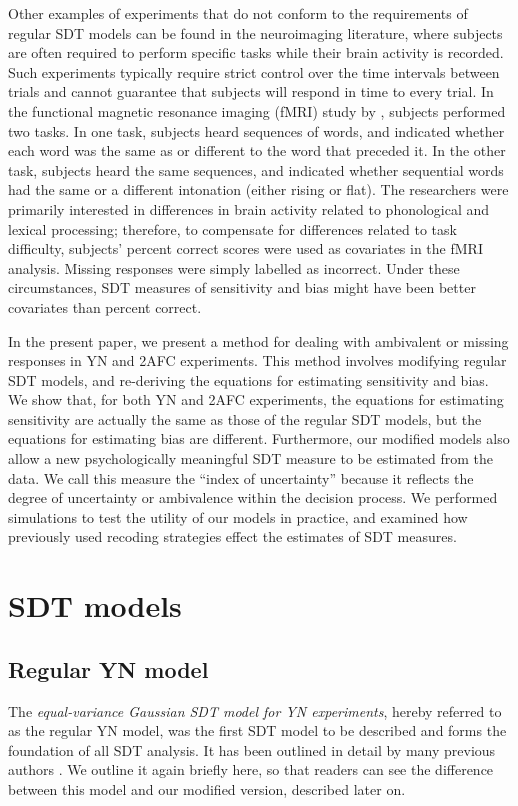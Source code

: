 \documentclass[man]{apa6}
\begin{document}
Other examples of experiments that do not conform to the requirements of regular SDT models can be found in the neuroimaging literature, where subjects are often required to perform specific tasks while their brain activity is recorded. Such experiments typically require strict control over the time intervals between trials and cannot guarantee that subjects will respond in time to every trial. In the functional magnetic resonance imaging (fMRI) study by \textcite{kreitewolfhemispheric2014}, subjects performed two tasks. In one task, subjects heard sequences of words, and indicated whether each word was the same as or different to the word that preceded it. In the other task, subjects heard the same sequences, and indicated whether sequential words had the same or a different intonation (either rising or flat). The researchers were primarily interested in differences in brain activity related to phonological and lexical processing; therefore, to compensate for differences related to task difficulty, subjects' percent correct scores were used as covariates in the fMRI analysis. Missing responses were simply labelled as incorrect. Under these circumstances, SDT measures of sensitivity and bias might have been better covariates than percent correct.

In the present paper, we present a method for dealing with ambivalent or missing responses in YN and 2AFC experiments. This method involves modifying regular SDT models, and re-deriving the equations for estimating sensitivity and bias. We show that, for both YN and 2AFC experiments, the equations for estimating sensitivity are actually the same as those of the regular SDT models, but the equations for estimating bias are different. Furthermore, our modified models also allow a new psychologically meaningful SDT measure to be estimated from the data. We call this measure the ``index of uncertainty'' because it reflects the degree of uncertainty or ambivalence within the decision process. We performed simulations to test the utility of our models in practice, and examined how previously used recoding strategies \parencite[e.g.,][]{laskowskaemotional2015, kreitewolfhemispheric2014} effect the estimates of SDT measures.

\section{SDT models}
\subsection{Regular YN model}
The \emph{equal-variance Gaussian SDT model for YN experiments}, hereby referred to as the regular YN model, was the first SDT model to be described \parencite{Peterson1954, Tanner1954} and forms the foundation of all SDT analysis. It has been outlined in detail by many previous authors \parencite[e.g.,][]{Green1966, Macmillan2005}. We outline it again briefly here, so that readers can see the difference between this model and our modified version, described later on.
\end{document}
